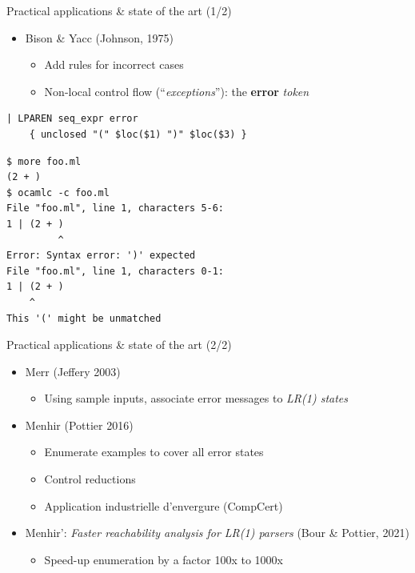 \documentclass{beamer}          %
\begin{document}
\begin{frame}[fragile]{Practical applications \& state of the art (1/2)}
  \begin{itemize}
    \item Bison \& Yacc (Johnson, 1975)
      \begin{itemize}
      \item Add rules for incorrect cases
      \item Non-local control flow (``{\em exceptions}''): the \textbf{error} {\em token}
    \end{itemize}
  \end{itemize}
\pause
\small
\begin{verbatim}
| LPAREN seq_expr error
    { unclosed "(" $loc($1) ")" $loc($3) }
\end{verbatim}
\pause
\begin{verbatim}
$ more foo.ml
(2 + )
$ ocamlc -c foo.ml
File "foo.ml", line 1, characters 5-6:
1 | (2 + )
         ^
Error: Syntax error: ')' expected
File "foo.ml", line 1, characters 0-1:
1 | (2 + )
    ^
This '(' might be unmatched
\end{verbatim}
\end{frame}

\begin{frame}[fragile]{Practical applications \& state of the art (2/2)}
  \begin{itemize}
    \item Merr (Jeffery 2003)
      \begin{itemize}
        \item Using sample inputs, associate error messages to {\em LR(1) states}
      \end{itemize}
    \pause
    \item Menhir (Pottier 2016)
      \begin{itemize}
        \item Enumerate examples to cover all error states
        \item Control reductions 
        \item Application industrielle d'envergure (CompCert)
      \end{itemize}
    \pause
    \pause
    \item Menhir': {\em Faster reachability analysis for LR(1) parsers} (Bour \& Pottier, 2021)
      \begin{itemize}
        \item Speed-up enumeration by a factor 100x to 1000x
      \end{itemize}
  \end{itemize}
\end{frame}
\end{document}
